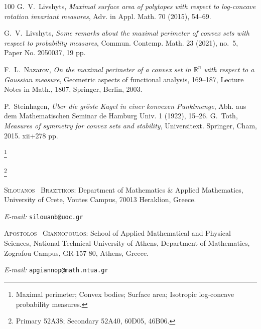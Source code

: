 \documentclass[11pt,leqno]{article}
\theoremstyle{remark}
\numberwithin{equation}{section}
\begin{document}
\begin{thebibliography}{100}
 \textrm{G.~V.~Livshyts}, \textit{Maximal surface area of polytopes with respect to log-concave rotation invariant measures},
Adv. in Appl. Math. 70 (2015), 54--69. 

 \textrm{G.~V.~Livshyts}, \textit{Some remarks about the maximal perimeter of convex sets with respect 
to probability measures}, Commun. Contemp. Math. 23 (2021), no.~5, Paper No. 2050037, 19 pp.

 \textrm{F.~L.~Nazarov}, \textit{On the maximal perimeter of a convex set in $\mathbb{R}^n$ with respect 
to a Gaussian measure}, Geometric aspects of functional analysis, 169--187, Lecture Notes in Math., 1807, Springer, Berlin, 2003. 

 \textrm{P.~Steinhagen}, \textit{\"{U}ber die gr\"{o}ste Kugel in einer konvexen Punktmenge}, Abh. aus dem
Mathematischen Seminar de Hamburg Univ. 1 (1922), 15--26.
 \textrm{G.~Toth}, \textit{Measures of symmetry for convex sets and stability}, Universitext. Springer, Cham, 2015. xii+278 pp. 

\end{thebibliography}


\bigskip


\thanks{ Maximal perimeter; Convex bodies; Surface area; Isotropic log-concave probability measures.}

\smallskip

\thanks{ Primary 52A38; Secondary 52A40, 60D05, 46B06.}

\bigskip

\bigskip 

\medskip 

\noindent \textsc{Silouanos \ Brazitikos}: Department of Mathematics \& Applied Mathematics, University of Crete, Voutes Campus, 70013 Heraklion, Greece.

\smallskip

\noindent \textit{E-mail:} \texttt{silouanb@uoc.gr}

\bigskip

\noindent \textsc{Apostolos \ Giannopoulos}: School of Applied Mathematical and Physical Sciences, National Technical University of Athens, Department of Mathematics, Zografou Campus, GR-157 80, Athens, Greece.


\smallskip

\noindent \textit{E-mail:} \texttt{apgiannop@math.ntua.gr}
\end{document}
